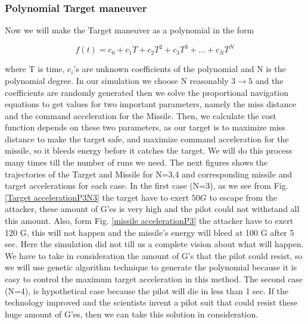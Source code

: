 
\subsubsection{Polynomial Target maneuver}
Now we will make the Target maneuver as a polynomial in the form

\begin{equation}
f(t) = c_0 + c_1 T + c_2 T^2 + c_3 T^3 + ... + c_N T^N
\end{equation} 

where T is time, $ c_i$'s  are unknown coefficients of the polynomial and N is the polynomial degree.
In our simulation we choose N reasonably $3\to5$ and the coefficients are randomly generated then we solve the proportional navigation equations to get values for two important parameters, namely the miss distance and the command acceleration for the Missile. Then, we calculate the cost function depends on these two parameters, as our target is to maximize miss distance to make the target safe, and maximize command acceleration for the missile, so it bleeds energy before it catches the target. We will do this process many times till the number of runs we need. The next figures shows the trajectories of the Target and Missile for N=3,4 and corresponding missile and target accelerations for each case.
In the first case (N=3), as we see from Fig. \ref{Target accelerationP3N3} the target have to exert $50 G$ to escape from the attacker, these amount of G'es is very high and the pilot could not withstand all this amount. Also, form Fig. \ref{missile accelerationP3} the attacker have to exert 120 G, this will not happen and the missile's energy will bleed at 100 G after 5 sec. Here the simulation did not till us a complete vision about what will happen. We have to take in consideration the amount of G's that the pilot could resist, so we will use genetic algorithm technique to generate the polynomial because it is easy to control the maximum target acceleration in this method.
The second case (N=4), is hypothetical case because the pilot will die in less than 1 sec. If the technology improved and the scientists invent a pilot suit that could resist these huge amount of G'es, then we can take this solution in consideration.        

